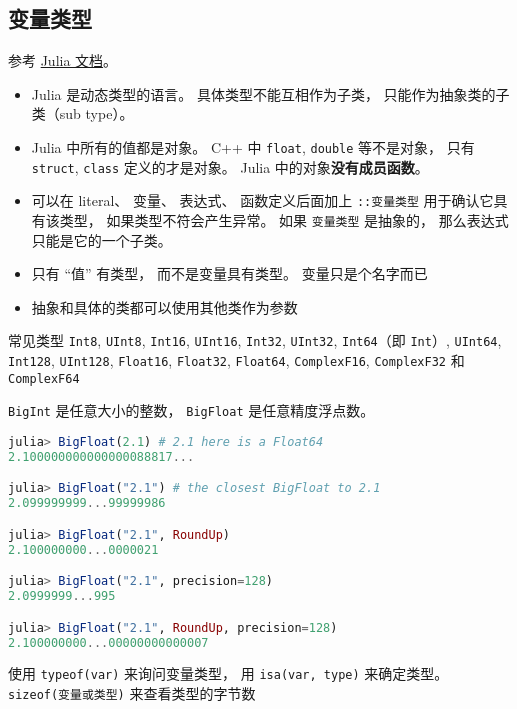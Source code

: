
\begin{issues}
\issueDraft
\end{issues}

\subsection{变量类型}

参考 \href{https://docs.julialang.org/en/v1/manual/types/#man-declared-types}{Julia 文档}。
\begin{itemize}
\item Julia 是动态类型的语言。 具体类型不能互相作为子类， 只能作为抽象类的子类（sub type）。
\item Julia 中所有的值都是对象。 C++ 中 \verb`float`, \verb`double` 等不是对象， 只有 \verb`struct`, \verb`class` 定义的才是对象。 Julia 中的对象\textbf{没有成员函数}。
\item 可以在 literal、 变量、 表达式、 函数定义后面加上 \verb`::变量类型` 用于确认它具有该类型， 如果类型不符会产生异常。 如果 \verb`变量类型` 是抽象的， 那么表达式只能是它的一个子类。
\item 只有 “值” 有类型， 而不是变量具有类型。 变量只是个名字而已
\item 抽象和具体的类都可以使用其他类作为参数
\end{itemize}

常见类型
\verb`Int8`, \verb`UInt8`, \verb`Int16`, \verb`UInt16`, \verb`Int32`, \verb`UInt32`, \verb`Int64`（即 \verb`Int`）, \verb`UInt64`, \verb`Int128`, \verb`UInt128`, \verb`Float16`, \verb`Float32`, \verb`Float64`, \verb`ComplexF16`, \verb`ComplexF32` 和 \verb`ComplexF64`

\verb`BigInt` 是任意大小的整数， \verb`BigFloat` 是任意精度浮点数。

\begin{lstlisting}[language=julia]
julia> BigFloat(2.1) # 2.1 here is a Float64
2.100000000000000088817...

julia> BigFloat("2.1") # the closest BigFloat to 2.1
2.099999999...99999986

julia> BigFloat("2.1", RoundUp)
2.100000000...0000021

julia> BigFloat("2.1", precision=128)
2.0999999...995

julia> BigFloat("2.1", RoundUp, precision=128)
2.100000000...00000000000007
\end{lstlisting}

使用 \verb`typeof(var)` 来询问变量类型， 用 \verb`isa(var, type)` 来确定类型。 \verb`sizeof(变量或类型)` 来查看类型的字节数

